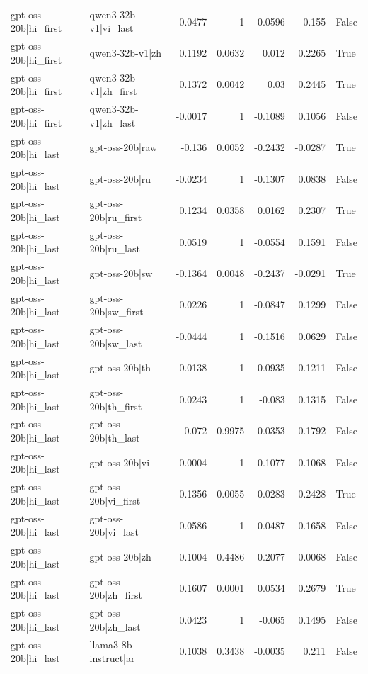 \begin{table}
\begin{tabular}{l l r r r r l}
gpt-oss-20b|hi_first & qwen3-32b-v1|vi_last & 0.0477 & 1 & -0.0596 & 0.155 & False \\
gpt-oss-20b|hi_first & qwen3-32b-v1|zh & 0.1192 & 0.0632 & 0.012 & 0.2265 & True \\
gpt-oss-20b|hi_first & qwen3-32b-v1|zh_first & 0.1372 & 0.0042 & 0.03 & 0.2445 & True \\
gpt-oss-20b|hi_first & qwen3-32b-v1|zh_last & -0.0017 & 1 & -0.1089 & 0.1056 & False \\
gpt-oss-20b|hi_last & gpt-oss-20b|raw & -0.136 & 0.0052 & -0.2432 & -0.0287 & True \\
gpt-oss-20b|hi_last & gpt-oss-20b|ru & -0.0234 & 1 & -0.1307 & 0.0838 & False \\
gpt-oss-20b|hi_last & gpt-oss-20b|ru_first & 0.1234 & 0.0358 & 0.0162 & 0.2307 & True \\
gpt-oss-20b|hi_last & gpt-oss-20b|ru_last & 0.0519 & 1 & -0.0554 & 0.1591 & False \\
gpt-oss-20b|hi_last & gpt-oss-20b|sw & -0.1364 & 0.0048 & -0.2437 & -0.0291 & True \\
gpt-oss-20b|hi_last & gpt-oss-20b|sw_first & 0.0226 & 1 & -0.0847 & 0.1299 & False \\
gpt-oss-20b|hi_last & gpt-oss-20b|sw_last & -0.0444 & 1 & -0.1516 & 0.0629 & False \\
gpt-oss-20b|hi_last & gpt-oss-20b|th & 0.0138 & 1 & -0.0935 & 0.1211 & False \\
gpt-oss-20b|hi_last & gpt-oss-20b|th_first & 0.0243 & 1 & -0.083 & 0.1315 & False \\
gpt-oss-20b|hi_last & gpt-oss-20b|th_last & 0.072 & 0.9975 & -0.0353 & 0.1792 & False \\
gpt-oss-20b|hi_last & gpt-oss-20b|vi & -0.0004 & 1 & -0.1077 & 0.1068 & False \\
gpt-oss-20b|hi_last & gpt-oss-20b|vi_first & 0.1356 & 0.0055 & 0.0283 & 0.2428 & True \\
gpt-oss-20b|hi_last & gpt-oss-20b|vi_last & 0.0586 & 1 & -0.0487 & 0.1658 & False \\
gpt-oss-20b|hi_last & gpt-oss-20b|zh & -0.1004 & 0.4486 & -0.2077 & 0.0068 & False \\
gpt-oss-20b|hi_last & gpt-oss-20b|zh_first & 0.1607 & 0.0001 & 0.0534 & 0.2679 & True \\
gpt-oss-20b|hi_last & gpt-oss-20b|zh_last & 0.0423 & 1 & -0.065 & 0.1495 & False \\
gpt-oss-20b|hi_last & llama3-8b-instruct|ar & 0.1038 & 0.3438 & -0.0035 & 0.211 & False \\

\end{tabular}
\end{table}
